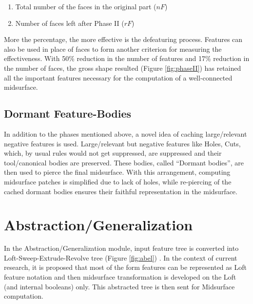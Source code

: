 	\begin{enumerate}
	[noitemsep,topsep=2pt,parsep=2pt,partopsep=2pt]
	\item Total number of the faces in the original part ($nF$)
	\item Number of faces left after Phase II ($rF$)
	\end{enumerate}
		More the percentage, the more effective is the defeaturing process. Features can also be used in place of faces to form another criterion for measuring the effectiveness.
	With 50\% reduction in the number of features and 17\% reduction in the number of faces, the gross shape resulted (Figure  \ref{fig:phaseII}) has retained all the important features necessary for the computation of a well-connected midsurface.

\subsection{Dormant Feature-Bodies}\label{sec:dormant}

In addition to the phases mentioned above, a novel idea of caching large/relevant negative features is used.  Large/relevant but negative features like Holes, Cuts, which, by usual rules would not get suppressed, are suppressed and their tool/canonical bodies are preserved. These bodies, called ``Dormant bodies'', are then used to pierce the final midsurface. With this arrangement, computing midsurface patches is simplified due to lack of holes, while re-piercing of the cached dormant bodies ensures their faithful representation in the midsurface.


\section{Abstraction/Generalization}  \label{cagd:sec:abstraction}
In the Abstraction/Generalization module, input feature tree is converted into Loft-Sweep-Extrude-Revolve tree (Figure \ref{fig:abel}) \cite{YogeshIITG2014}.  In the context of current research, it is proposed that most of the form features can be represented as Loft feature notation and then midsurface transformation is developed on the Loft (and internal booleans) only.  This abstracted tree is then sent for Midsurface computation. 

